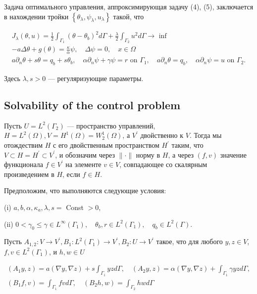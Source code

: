 Задача оптимального управления, аппроксимирующая задачу (4), (5),
заключается в нахождении тройки $\left\{\theta_{\lambda}, \psi_{\lambda}, u_{\lambda}\right\}$
такой, что

\[
    \begin{gathered}
        J_{\lambda}(\theta, u)=\frac{1}{2} \int_{\Gamma_{1}}\left(\theta-\theta_{b}\right)^{2} d
        \Gamma+\frac{\lambda}{2} \int_{\Gamma_{2}} u^{2} d \Gamma \rightarrow \text{ inf } \\
        -a \Delta \theta+g(\theta)=\frac{\kappa}{\alpha} \psi, \quad \Delta \psi=0, \quad x \in \Omega \\
        a \partial_{n} \theta+s \theta=q_{b}+s \theta_{b},
        \quad \alpha \partial_{n} \psi+\gamma \psi=r \text{ on } \Gamma_{1},
        \quad a \partial_{n} \theta=q_{b}, \quad \alpha \partial_{n} \psi=u \text{ on } \Gamma_{2}.
    \end{gathered}
\]


Здесь $\lambda, s>0$ — регуляризующие параметры.

\subsection{Solvability of the control problem}
Пусть $U=L^{2}\left(\Gamma_{2}\right)$ — пространство управлений,
$H=L^{2}(\Omega), V=H^{1}(\Omega )=W_{2}^{1}(\Omega)$, а $V^{\prime}$ двойственно к $V$.
Тогда мы отождествим $H$ с его двойственным пространством $H^{\prime}$ таким,
что $V \subset H=H^{\prime} \subset V^{\prime}$, и обозначим через $\|\cdot \|$ норму в $H$,
а через $(f, v)$ значение функционала $f \in V^{\prime}$ на элементе $v \in V$,
совпадающее со скалярным произведением в $ H$, если $f \in H$.


Предположим, что выполняются следующие условия:

(i) $a, b, \alpha, \kappa_{a}, \lambda, s=$ Const $>0$,

(ii) $0<\gamma_{0} \leq \gamma \in L^{\infty}\left(\Gamma_{1}\right), \quad \theta_{b},
r \in L^{2}\left(\Gamma_{1}\right), \quad q_{b} \in L^{2}(\Gamma)$.

Пусть $A_{1,2}: V \rightarrow V^{\prime}, B_{1}: L^{2}\left(\Gamma_{1}\right) \rightarrow V^{\prime},
B_{2}: U \rightarrow V^{\prime}$ такое, что для любого
$y, z \in V$, $f, v \in L^{2}\left(\Gamma_{1}\right)$, и $h, w \in U$

\[
    \begin{gathered}
        \left(A_{1} y, z\right)=a(\nabla y, \nabla z)+s \int_{\Gamma_{1}} y z d \Gamma,
        \quad\left(A_{2} y, z\right)=\alpha(\nabla y, \nabla z)+\int_{\Gamma_{1}} \gamma y z d \Gamma, \\
        \left(B_{1} f, v\right)=\int_{\Gamma_{1}} f v d \Gamma, \quad\left(B_{2} h, w\right)=\int_{\Gamma_{2}} h w d \Gamma
    \end{gathered}
\]

